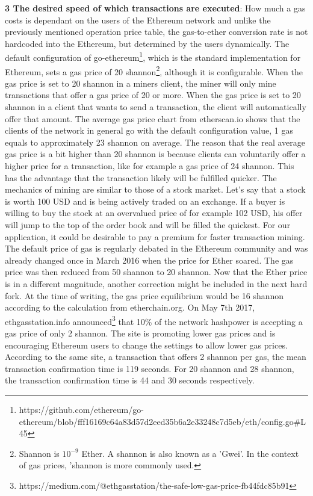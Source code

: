 \par
\textbf{3 The desired speed of which transactions are executed}: How much a gas costs is dependant on the users of the Ethereum network and unlike the previously mentioned operation price table, the gas-to-ether conversion rate is not hardcoded into the Ethereum, but determined by the users dynamically. The default configuration of go-ethereum\footnote{ https://github.com/ethereum/go-ethereum/blob/fff16169c64a83d57d2eed35b6a2e33248c7d5eb/eth/config.go\#L45}, which is the standard implementation for Ethereum, sets a gas price of 20 shannon\footnote{ Shannon is $10^{-9}$ Ether. A shannon is also known as a 'Gwei'. In the context of gas prices, 'shannon is more commonly used.}, although it is configurable. When the gas price is set to 20 shannon in a miners client, the miner will only mine transactions that offer a gas price of 20 or more. When the gas price is set to 20 shannon in a client that wants to send a transaction, the client will automatically offer that amount. The average gas price chart from etherscan.io shows that the clients of the network in general go with the default configuration value, 1 gas equals to approximately 23 shannon on average.
The reason that the real average gas price is a bit higher than 20 shannon is because clients can voluntarily offer a higher price for a transaction, like for example a gas price of 24 shannon. This has the advantage that the transaction likely will be fulfilled quicker. The mechanics of mining are similar to those of a stock market. Let's say that a stock is worth 100 USD and is being actively traded on an exchange. If a buyer is willing to buy the stock at an overvalued price of for example 102 USD, his offer will jump to the top of the order book and will be filled the quickest. For our application, it could be desirable to pay a premium for faster transaction mining.
The default price of gas is regularly debated in the Ethereum community and was already changed once in March 2016 when the price for Ether soared. The gas price was then reduced from 50 shannon to 20 shannon. Now that the Ether price is in a different magnitude, another correction might be included in the next hard fork. At the time of writing, the gas price equilibrium would be 16 shannon according to the calculation from etherchain.org.
On May 7th 2017, ethgasstation.info announced\footnote{https://medium.com/@ethgasstation/the-safe-low-gas-price-fb44fdc85b91} that 10\% of the network hashpower is accepting a gas price of only 2 shannon. The site is promoting lower gas prices and is encouraging Ethereum users to change the settings to allow lower gas prices. According to the same site, a transaction that offers 2 shannon per gas, the mean transaction confirmation time is 119 seconds. For 20 shannon and 28 shannon, the transaction confirmation time is 44 and 30 seconds respectively.

